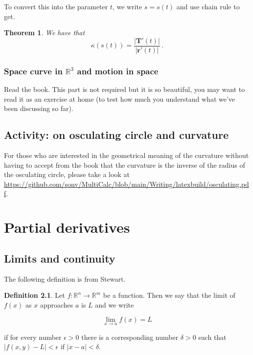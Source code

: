 \documentclass[
]{book}
\newtheorem{theorem}{Theorem}[chapter]
\theoremstyle{definition}
\newtheorem{definition}{Definition}[chapter]
\theoremstyle{definition}
\theoremstyle{definition}
\theoremstyle{definition}
\theoremstyle{remark}
\begin{document}
To convert this into the parameter \(t\), we write \(s= s(t)\) and use chain rule
to get.

\begin{theorem}
We have that
\begin{equation*}
    \kappa(s(t)) =  \frac{|\mathbf{T}'(t)|}{|\mathbf{r}'(t)|}   \,.
\end{equation*}
\end{theorem}

\subsection{\texorpdfstring{Space curve in \(\mathbb{R}^3\) and motion in space}{Space curve in \textbackslash mathbb\{R\}\^{}3 and motion in space}}\label{space-curve-in-mathbbr3-and-motion-in-space}

Read the book. This part is not required but it is so beautiful, you may want to read it
as an exercise at home (to test how much you understand what we've been discussing so far).

\section{Activity: on osculating circle and curvature}\label{activity-on-osculating-circle-and-curvature}

For those who are interested in the geometrical meaning of the curvature without having
to accept from the book that the curvature is the inverse of the radius of the osculating circle,
please take a look at \url{https://github.com/sonv/MultiCalc/blob/main/Writing/latexbuild/osculating.pdf}.

\newpage

\chapter{Partial derivatives}\label{partial-derivatives}

\section{Limits and continuity}\label{limits-and-continuity}

The following definition is from Stewart.

\begin{definition}
Let \(f: \mathbb{R}^n \to \mathbb{R}^m\) be a function. Then we say that the limit of \(f(x)\) as \(x\) approaches \(a\) is \(L\) and we write

\[\lim_{x \to a} f(x) = L\]

if for every number \(\epsilon > 0\) there is a corresponding number \(\delta > 0\) such that
\(|f(x,y) - L| < \epsilon\)
if \(| x - a| < \delta\).
\end{definition}
\end{document}
